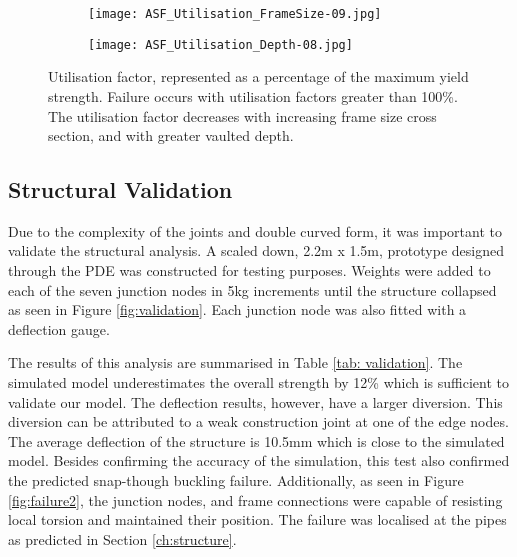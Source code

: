 \begin{figure}
    \centering
    \begin{subfigure}[b]{0.8\columnwidth}
        \texttt{[image: ASF\_Utilisation\_FrameSize-09.jpg]}
        \caption{} 
        \label{fig:frameSize}
    \end{subfigure} 
    \vspace{10mm}

    \begin{subfigure}[b]{0.8\columnwidth}
        \texttt{[image: ASF\_Utilisation\_Depth-08.jpg]}
        \caption{}
        \label{fig:StructuralDepth}
    \end{subfigure}
    \hfill

    \caption{Utilisation factor, represented as a percentage of the maximum yield strength. Failure occurs with utilisation factors greater than 100\%. The utilisation factor decreases with increasing frame size cross section, and with greater vaulted depth.}
    \label{fig:utilisation}
\end{figure}

\subsection{Structural Validation}

Due to the complexity of the joints and double curved form, it was important to validate the structural analysis. A scaled down, 2.2m x 1.5m, prototype designed through the PDE was constructed for testing purposes. Weights were added to each of the seven junction nodes in 5kg increments until the structure collapsed as seen in Figure \ref{fig:validation}. Each junction node was also fitted with a deflection gauge.

The results of this analysis are summarised in Table \ref{tab: validation}. The simulated model underestimates the overall strength by 12\% which is sufficient to validate our model. The deflection results, however, have a larger diversion. This diversion can be attributed to a weak construction joint at one of the edge nodes. The average deflection of the structure is 10.5mm which is close to the simulated model. Besides confirming the accuracy of the simulation, this test also confirmed the predicted snap-though buckling failure. Additionally, as seen in Figure \ref{fig:failure2}, the junction nodes, and frame connections were capable of resisting local torsion and maintained their position. The failure was localised at the pipes as predicted in Section \ref{ch:structure}. 

